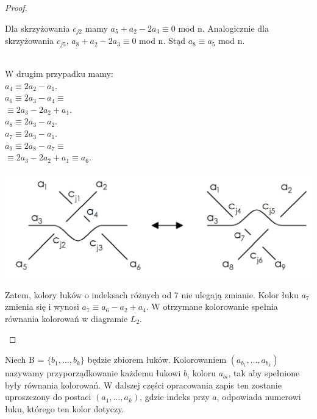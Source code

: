 \begin{proof}
\begin{enumerate}
	Dla skrzyżowania $c_{j2}$ mamy $a_{5}+a_{2}-2a_{3} \equiv 0$ mod n. Analogicznie dla skrzyżowania $c_{j5}$, $a_{8}+a_{2}-2a_{3} \equiv 0$ mod n. Stąd $a_{8} \equiv a_{5}$ mod n. \\ \\
	\begin{minipage}{0.35\textwidth}
	W drugim przypadku mamy:\\
	$a_{4} \equiv 2a_{2}-a_{1}$. \\
	$a_{6} \equiv 2a_{3}-a_{4} \equiv$ \\$\equiv 2a_{3}-2a_{2}+a_{1} $.	\\
	$a_{8} \equiv 2a_{3}-a_{2}$. \\	
	$a_{7} \equiv 2a_{3}-a_{1}$.\\		
	$a_{9} \equiv 2a_{8}-a_{7} \equiv$ \\$\equiv 2a_{3}-2a_{2}+a_{1} \equiv a_{6} $. \\
	\end{minipage}
	\begin{minipage}{0.65\textwidth}
		\begin{center}
			\includegraphics[scale=0.25]{2/Obrazy/R3}
		\end{center}
	\end{minipage}
	Zatem, kolory łuków o indeksach różnych od 7 nie ulegają zmianie. Kolor łuku $a_{7}$ zmienia się i wynosi $a_{7} \equiv a_{6} - a_{2} + a_{4}$. W otrzymane kolorowanie spełnia równania kolorowań w diagramie $L_{2}$.
\end{enumerate}
\end{proof}


\begin{definicja}
Niech B = $\lbrace b_{1}, \ldots, b_{k}\rbrace$ będzie zbiorem łuków. Kolorowaniem $(a_{b_{1}}, \ldots, a_{b_{k}})$ nazywamy przyporządkowanie każdemu łukowi $b_{i}$ koloru $a_{b{i}}$, tak aby spełnione były równania kolorowań. W dalszej części opracowania zapis ten zostanie uproszczony do postaci $(a_{1}, \ldots, a_{k})$, gdzie indeks przy $a$, odpowiada numerowi łuku, którego ten kolor dotyczy.
\end{definicja}


